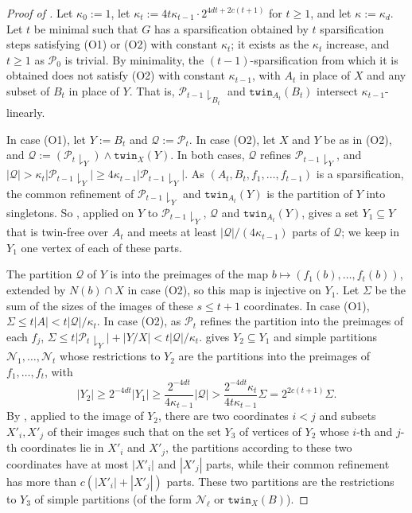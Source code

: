 \documentclass[11pt]{article}
\theoremstyle{definition}
\newcommand{\inducedSS}[2]{#1/#2}%
\renewcommand{\le}{\leqslant}
\renewcommand{\ge}{\geqslant}
\newcommand{\res}[1]{{\downharpoonright}_{#1}}
\newcommand{\Pp}{\mathcal{P}}
\newcommand{\Qq}{\mathcal{Q}}
\newcommand{\twin}{\mathtt{twin}}
\begin{document}
\begin{proof}[Proof of ]
Let $\kappa_0 := 1$, let $\kappa_t := 4t\kappa_{t-1} \cdot 2^{4dt + 2c(t+1)}$ for $t \ge 1$, and let $\kappa := \kappa_d$.
Let $t$ be minimal such that $G$ has a sparsification obtained by $t$ sparsification steps satisfying (O1) or (O2) with constant $\kappa_t$; it exists as the $\kappa_t$ increase, and $t \ge 1$ as $\Pp_0$ is trivial.
By minimality, the $(t-1)$-sparsification from which it is obtained does not satisfy (O2) with constant $\kappa_{t-1}$, with $A_t$ in place of $X$ and any subset of $B_t$ in place of $Y$.
That is, $\Pp_{t-1} \res {B_t}$ and $\twin_{A_t}(B_t)$ intersect $\kappa_{t-1}$-linearly.

In case (O1), let $Y := B_t$ and $\Qq := \Pp_t$.
In case (O2), let $X$ and $Y$ be as in (O2), and $\Qq := (\Pp_t \res Y) \wedge \twin_X(Y)$.
In both cases, $\Qq$ refines $\Pp_{t-1} \res Y$, and $|\Qq| > \kappa_t |\Pp_{t-1} \res Y| \ge 4\kappa_{t-1} |\Pp_{t-1} \res Y|$.
As $(A_t, B_t, f_1, \dots, f_{t-1})$ is a sparsification, the common refinement of $\Pp_{t-1} \res Y$ and $\twin_{A_t}(Y)$ is the partition of $Y$ into singletons.
So , applied on $Y$ to $\Pp_{t-1} \res Y$, $\Qq$ and $\twin_{A_t}(Y)$, gives a set $Y_1 \subseteq Y$ that is twin-free over $A_t$ and meets at least $|\Qq|/(4\kappa_{t-1})$ parts of $\Qq$; we keep in $Y_1$ one vertex of each of these parts.

The partition $\Qq$ of $Y$ is into the preimages of the map $b \mapsto (f_1(b), \dots, f_t(b))$, extended by $N(b) \cap X$ in case (O2), so this map is injective on $Y_1$.
Let $\Sigma$ be the sum of the sizes of the images of these $s \le t + 1$ coordinates.
In case (O1), $\Sigma \le t|A| < t|\Qq|/\kappa_t$.
In case (O2), as $\Pp_t$ refines the partition into the preimages of each $f_j$, $\Sigma \le t|\Pp_t \res Y| + |\inducedSS{Y}{X}| < t|\Qq|/\kappa_t$.
 gives $Y_2 \subseteq Y_1$ and simple partitions $\mathcal N_1, \dots, \mathcal N_t$ whose restrictions to $Y_2$ are the partitions into the preimages of $f_1, \dots, f_t$, with
\[
  |Y_2| \ge 2^{-4dt}|Y_1| \ge \frac{2^{-4dt}}{4\kappa_{t-1}} |\Qq| > \frac{2^{-4dt} \kappa_t}{4t\kappa_{t-1}} \Sigma = 2^{2c(t+1)} \Sigma.
\]
By , applied to the image of $Y_2$, there are two coordinates $i < j$ and subsets $X'_i, X'_j$ of their images such that on the set $Y_3$ of vertices of $Y_2$ whose $i$-th and $j$-th coordinates lie in $X'_i$ and $X'_j$, the partitions according to these two coordinates have at most $|X'_i|$ and $|X'_j|$ parts, while their common refinement has more than $c(|X'_i| + |X'_j|)$ parts.
These two partitions are the restrictions to $Y_3$ of simple partitions (of the form $\mathcal N_\ell$ or $\twin_X(B)$).
\end{proof}
\end{document}
